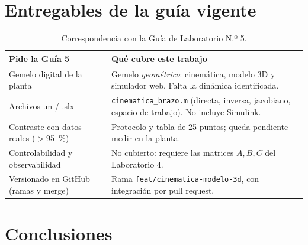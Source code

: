 \documentclass[a4paper,12pt]{article}
\newcommand{\codigo}[1]{\texttt{\small #1}}
\begin{document}
\section{Entregables de la guía vigente}
\label{sec:guia}
\begin{table}[H]
\centering
\begin{tabular}{@{}p{6.2cm}p{8.6cm}@{}}
\toprule
\textbf{Pide la Guía 5} & \textbf{Qué cubre este trabajo}\\
\midrule
Gemelo digital de la planta & Gemelo \emph{geométrico}: cinemática, modelo 3D y simulador web. Falta la dinámica identificada.\\
Archivos .m / .slx & \codigo{cinematica\_brazo.m} (directa, inversa, jacobiano, espacio de trabajo). No incluye Simulink.\\
Contraste con datos reales ($>$95~\%) & Protocolo y tabla de 25 puntos; queda pendiente medir en la planta.\\
Controlabilidad y observabilidad & No cubierto: requiere las matrices $A, B, C$ del Laboratorio 4.\\
Versionado en GitHub (ramas y merge) & Rama \codigo{feat/cinematica-modelo-3d}, con integración por pull request.\\
\bottomrule
\end{tabular}
\caption{Correspondencia con la Guía de Laboratorio N.º 5.}
\end{table}

\section{Conclusiones}
\end{document}
